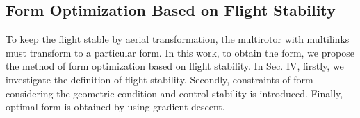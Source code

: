 \subsection{Form Optimization Based on Flight Stability}
To keep the flight stable by aerial transformation, the multirotor with multilinks must transform to a particular form. In this work, to obtain the form, we propose the method of form optimization based on flight stability. In Sec. IV, firstly, we investigate the definition of flight stability. Secondly, constraints of form considering the geometric condition and control stability is introduced. Finally, optimal form is obtained by using gradient descent.
